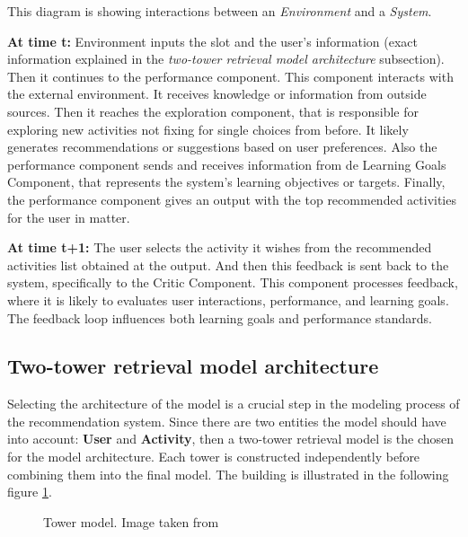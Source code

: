 \documentclass[10pt,twocolumn,letterpaper]{article}
\begin{document}
This diagram is showing interactions between an \textit{Environment} and a \textit{System}. 

\textbf{At time t:} Environment inputs the slot and the user's information (exact information explained in the \textit{two-tower retrieval model architecture} subsection). 
Then it continues to the performance component. This component interacts with the external environment. It receives knowledge or information from outside sources. Then it reaches the exploration component, that is responsible for exploring new activities not fixing for single choices from before. It likely generates recommendations or suggestions based on user preferences. Also the performance component sends and receives information from de Learning Goals Component, that represents the system’s learning objectives or targets. Finally, the performance component gives an output with the top recommended activities for the user in matter.

\textbf{At time t+1:} The user selects the activity it wishes from the recommended activities list obtained at the output. And then this feedback is sent back to the system, specifically to the Critic Component. This component processes feedback, where it is likely to evaluates user interactions, performance, and learning goals. The feedback loop influences both learning goals and performance standards.


\subsection{Two-tower retrieval model architecture}
Selecting the architecture of the model is a crucial step in the modeling process of the recommendation system. Since there are two entities the model should have into account: \textbf{User} and \textbf{Activity}, then a two-tower retrieval model is the chosen for the model architecture. Each tower is constructed independently before combining them into the final model. The building is illustrated in the following figure \ref{fig:tower}. 

\begin{figure}[h]
       \centering
       \caption{Tower model. Image taken from \cite{tfrs}}
    \label{fig:tower}
\end{figure}
\end{document}
